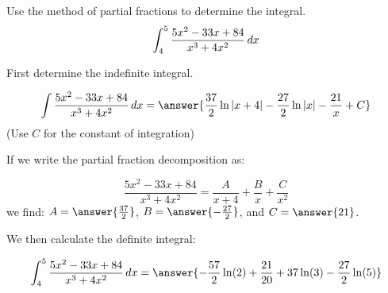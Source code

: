 \documentclass{ximera}
\author{Jim Talamo and Jason Miller}
\begin{document}
\begin{exercise}
Use the method of partial fractions to determine the integral.
\[
\int_{4}^{5} \frac{5x^{2}-33x+84}{x^{3}+4x^{2}} \mathop{}\!d x
\]

First determine the indefinite integral.

\[
\int \frac{5x^{2}-33x+84}{x^{3}+4x^{2}} \d x=\answer{ \frac{37}{2} \ln|x+4| -\frac{27}{2}\ln|x| - \frac{21}{x} +C   } 
\]
(Use $C$ for the constant of integration)

\begin{hint}
If we write the partial fraction decomposition as:

\[
 \frac{5x^2-33x+84}{x^3+4x^2} = \frac{A}{x+4}+\frac{B}{x} +\frac{C}{x^2}
\]
we find: $A= \answer{\frac{37}{2}}$, $B= \answer{-\frac{27}{2}}$, and $C = \answer{21}$.
\end{hint}

\begin{exercise}

We then calculate the definite integral: 

\[
\int_{4}^{5} \frac{5x^{2}-33x+84}{x^{3}+4x^{2} }\d x=\answer{ -\frac{57}{2} \ln(2)+\frac{21}{20} +37 \ln(3)-\frac{27}{2} \ln(5) }
\]

\end{exercise}
\end{exercise}
\end{document}

